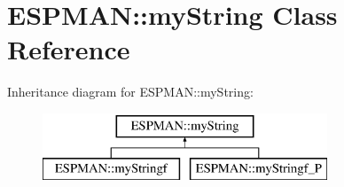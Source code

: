\hypertarget{class_e_s_p_m_a_n_1_1my_string}{}\section{E\+S\+P\+M\+AN\+:\+:my\+String Class Reference}
\label{class_e_s_p_m_a_n_1_1my_string}
Inheritance diagram for E\+S\+P\+M\+AN\+:\+:my\+String\+:\begin{figure}[H]
\begin{center}
\leavevmode
\includegraphics[height=2.000000cm]{class_e_s_p_m_a_n_1_1my_string}
\end{center}
\end{figure}
